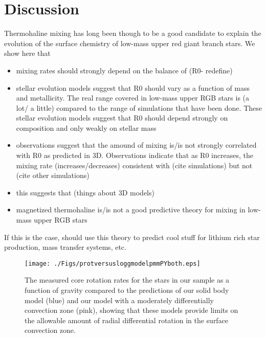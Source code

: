 \documentclass[linenumbers,twocolumn]{aastex62}
\begin{document}
\section{Discussion}

Thermohaline mixing has long been though to be a good candidate to explain the evolution of the surface chemistry of low-mass upper red giant branch stars. We show here that

\begin{itemize}
    \item mixing rates should strongly depend on the balance of (R0- redefine)
    
    \item stellar evolution models suggest that R0 should vary as a function of mass and metallicity. The real range covered in low-mass upper RGB stars is (a lot/ a little) compared to the range of simulations that have been done. These stellar evolution models suggest that R0 should depend strongly on composition and only weakly on stellar mass
    
    \item observations suggest that the amound of mixing is/is not strongly correlated with R0 as predicted in 3D. Observations indicate that as R0 increases, the mixing rate (increases/decreases) consistent with (cite simulations) but not (cite other simulations)
    
    \item this suggests that (things about 3D models)
    
    \item magnetized thermohaline is/is not a good predictive theory for mixing in low-mass upper RGB stars
\end{itemize}
    
    If this is the case, should use this theory to predict cool stuff for lithium rich star production, mass transfer systems, etc. 





\begin{figure}[!htb]
\begin{center}
\texttt{[image: ./Figs/protversusloggmodelpmmPYboth.eps]}%
\caption{The measured core rotation rates for the stars in our sample as a function of gravity compared to the predictions of our solid body model (blue) and our model with a moderately differentially convection zone (pink), showing that these models provide limits on the allowable amount of radial differential rotation in the surface convection zone.}
\label{Fig:bothmodels}
\end{center}
\end{figure}
\end{document}
